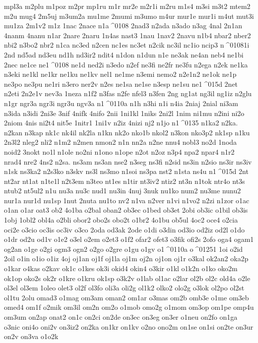 {mpl3a
m2plu
m1poz
m2pr
mp1ru
m1r
mr2e
m2r1i
m2ru
m1s4
m3si
m3t2
mtem2
m2u
mug4
2m5uj
m3um2a
mu1me
2mumi
m3umo
m4ur
mur1e
mur1i
m4ut
mut3i
mu1za
2m1v2
m1z
1nac
2nace
n1a^^^^0108
2nad3
n2ada
n3ado
n3ag
4nal
2n1an
4nanm
4nanu
n1ar
2nare
2naru
1n4as
nast3
1nau
1nav2
2navu
n1b4
nbar2
nber2
nbi2
n3bo2
nbr2
n1ca
nc3ed
n2cen
nc1es
nc3et
n2cik
nc3il
nc1io
ncip3
n^^^^01081i
2nd
nd5ad
nd3eu
nd1h
nd3ir2
ndit4
n1don
n1dun
n1e
ne3ak
ne4an
neb4
ne1bi
2nec
ne1ce
ne1^^^^0108
ne1d
ned2i
n3edo
n2ef
ne3fi
ne2fr
ne3fu
n2ega
n2ek
ne1ka
n3eki
ne1kl
ne1kr
ne1ku
ne1kv
nel1
ne1me
n3emi
nemo2
n2e1n2
ne1ok
ne1p
ne3po
ne3pu
ne1ri
n3ero
ner2v
n2es
ne1sa
ne1se
n3esp
ne1su
ne1^^^^015d
2net
n2eti
2n2e1v
nev3a
1neza
n1f2
n3fas
n2fe
nfel3
n3fen
2ng
ng1at
ng3il
ng1iz
n2glu
n1gr
ngr3a
ngr3i
ngr3u
ngv3a
n1^^^^0110a
n1h
n3hi
n1i
n4ia
2niaj
2nial
ni3am
n3ida
n3idi
2ni3e
3nif
4nifk
4nifo
2nii
1ni1kl
1niks
2ni2l
1nim
ni1mu
n2ini
ni2o
2niom
4nis
ni2t4
nit5e
1nitr1
1ni1v
n2iz
4nizi
nj2
n1jo
n1^^^^0135 
n1ka2
n2ka.
n2kan
n3kap
nk1c
nk4il
nk2la
n1kn
nk2o
nko1b
nkol2
n3kon
nko3p2
nk1sp
n1ku
2n3l2
nleg2
nli2
n1m2
n2men
nmon2
n1n
nn2a
n2ne
nnu4
nobl3
no2d
1noda
noid2
3nokt
no1l
n1ole
no2ni
n1ono
n1ope
n2ot
n2oz
n3p4
npa2
npar4
n1r2
nrad4
nre2
4ns2
n2sa.
ns3am
ns3an
nse2
n3seg
ns3fi
n2sid
ns3in
n2sio
ns3ir
ns3iv
n1sk
ns3ka2
n2s3ko
n3skv
ns3l
ns3mo
n1soi
ns3pa
nst2
n1sta
ns4u
n1^^^^015d
2nt
nt2ar
nt1at
n1te1l
n2t3em
n3teo
nt1es
n1tir
nt3iv2
ntiz2
nt3n
n1tok
ntr4o
nt3s
ntub2
nt5ul2
n1u
nu3a
nu3c
nud1
nu3in
4nuj
3nuk
nu1ko
num2
nu3me
nunu2
nur1a
nur1d
nu1sp
1nut
2nuta
nu1to
nv2
n1va
n2ver
n1vi
n1vo2
n2zi
n1zor
o1ac
o1an
o1ar
oat3
ob2
4o1ba
o2bal
oban2
ob3ec
o1bed
ob3et
2obi
ob3ic
o1bil
ob3is
1obj
1obl2
obl4a
o2bli
obor2
obo2s
obo2t
o1br2
4o1bu
ob5ul
4oc2
oce4
o2cia
oci2e
o3cio
oc3is
oc3iv
o3co
2oda
od3ak
2ode
o1di
o3din
od3io
od2iz
od2l
o1do
o1dr
od2u
od1v
o1e2
o3el
o2em
o2et3
o1f2
ofar2
ofet3
o3fik
ofi2s
2ofo
oga4
ogam1
og2an
o1ge
o2gi
ogm3
ogn2
o2go
o2gre
o1gu
o1gv
o1^^^^0110a
o^^^^01251
1oi
o2id
2oil
o1in
o1io
o1iz
4oj
oj1an
oj1f
oj1la
oj1m
oj2n
oj1on
oj1r
o3kal
ok2an2
oka2p
o1kar
o4kas
o2kav
ok1c
o1kes
ok3i
okid4
okin4
o3kir
o1kl
o1k2n
o1ko
oko2m
ok1op
oko2s
ok2r
o1kre
o1kru
ok1sp
o3k2v
o1lab
ol1ac
o2lar
ol2b
ol2c
old4a
o2le
ol3el
ol3em
1oleo
olet3
ol2f
ol3fo
oli3a
oli2g
ol1k2
olko2
olo2g
o3lok
ol2po
ol2st
ol1tu
2olu
omad3
o1mag
om3am
oman2
om1ar
o3mas
om2b
omb3e
o1me
om3eb
omed4
om1f
o2mik
om3il
om2n
om2o
o1mob
omo2g
o1mom
om3op
om1pe
omp4u
om3um
on2ap
onat2
on1c
on2ci
on2de
on3ec
on3eg
on3er
o1neu
on2fo
on1ga
o3nic
oni4o
oni2v
on3iz2
on2ka
on1kr
on1kv
o2no
ono2m
on1se
on1si
on2te
on3ur
on2v
on3va
o1o2k
}
